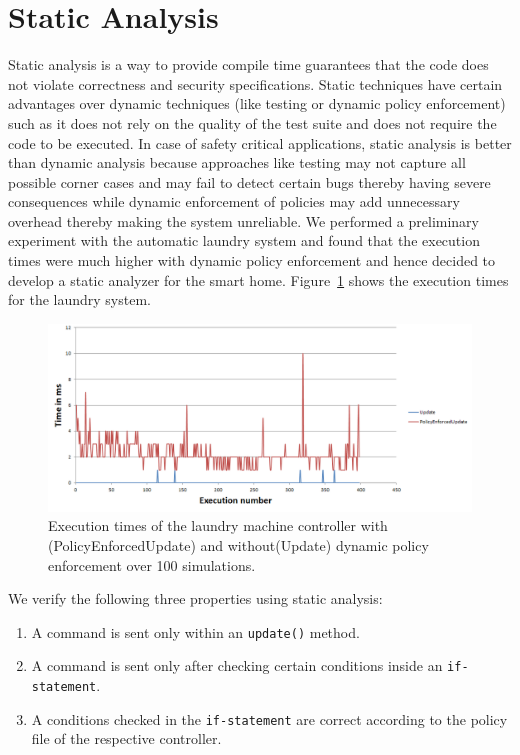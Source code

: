 \documentclass{article}
\begin{document}
\section{Static Analysis}
\label{sec:analysis}
Static analysis is a way to provide compile time guarantees that the code does not violate correctness and security specifications. Static techniques have certain advantages over dynamic techniques (like testing or dynamic policy enforcement) such as it does not rely on the quality of the test suite and does not require the code to be executed. In case of safety critical applications, static analysis is better than dynamic analysis because approaches like testing may not capture all possible corner cases and may fail to detect certain bugs thereby having severe consequences while dynamic enforcement of policies may add unnecessary overhead thereby making the system unreliable. We performed a preliminary experiment with the automatic laundry system and found that the execution times were much higher with dynamic policy enforcement and hence decided to develop a static analyzer for the smart home. Figure~\ref{fig:dynamic} shows the execution times for the laundry system. 

\begin{figure}[htpb]
\begin{center}
\includegraphics[scale=0.35, trim = 0 0 0 0]{results_update.png}
\caption{Execution times of the laundry machine controller with (PolicyEnforcedUpdate) and without(Update) dynamic policy enforcement over 100 simulations.}
\label{fig:dynamic}
\end{center}
\end{figure}
We verify the following three properties using static analysis:
\begin{enumerate}[topsep=0pt,itemsep=-1ex,partopsep=1ex,parsep=1ex]
    \item A command is sent only within an \texttt{update()} method.
    \item A command is sent only after checking certain conditions inside an \texttt{if-statement}.
    \item A conditions checked in the \texttt{if-statement} are correct according to the policy file of the respective controller.
\end{enumerate}
\end{document}
